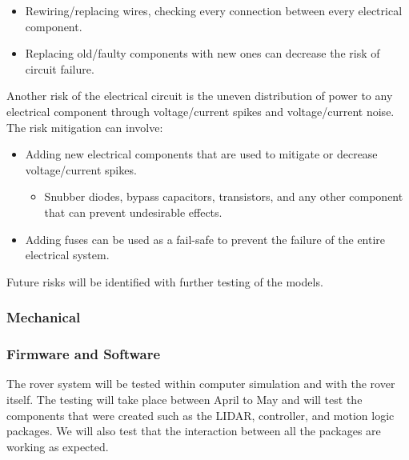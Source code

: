 \documentclass[a4paper, 10pt]{article}
\begin{document}
\begin{itemize}
\item
Rewiring/replacing wires, checking every connection between every electrical component.

\item
Replacing old/faulty components with new ones can decrease the risk of circuit failure.
\end{itemize}

Another risk of the electrical circuit is the uneven distribution of power to any electrical component through voltage/current spikes and voltage/current noise. The risk mitigation can involve:

\begin{itemize}
\item
Adding new electrical components that are used to mitigate or decrease voltage/current spikes.

	\begin{itemize}
		\item
		Snubber diodes, bypass capacitors, transistors, and any other component that can prevent undesirable effects. 
	\end{itemize}
	
\item
Adding fuses can be used as a fail-safe to prevent the failure of the entire electrical system.
\end{itemize}

Future risks will be identified with further testing of the models.

		\subsubsection{Mechanical}
		\subsubsection{Firmware and Software}
		The rover system will be tested within computer simulation and with the rover itself. The testing will take place between April to May and will test the components that were created such as the LIDAR, controller, and motion logic packages. We will also test that the interaction between all the packages are working as expected. 
		
\end{document}
